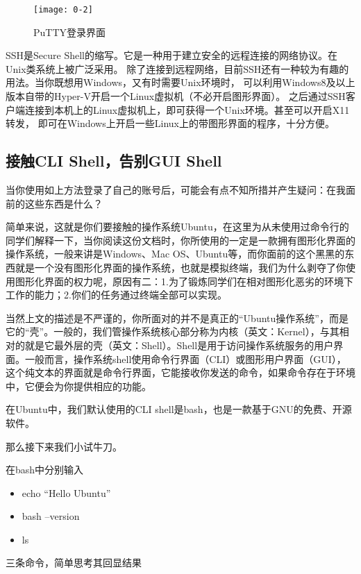 \begin{figure}[htbp]
  \centering
  \texttt{[image: 0-2]}
  \caption{PuTTY登录界面}\label{fig:0-2}
\end{figure}

\begin{note}
SSH是Secure Shell的缩写。它是一种用于建立安全的远程连接的网络协议。在Unix类系统上被广泛采用。
除了连接到远程网络，目前SSH还有一种较为有趣的用法。当你既想用Windows，又有时需要Unix环境时，
可以利用Windows8及以上版本自带的Hyper-V开启一个Linux虚拟机（不必开启图形界面）。
之后通过SSH客户端连接到本机上的Linux虚拟机上，即可获得一个Unix环境。甚至可以开启X11转发，
即可在Windows上开启一些Linux上的带图形界面的程序，十分方便。
\end{note}

\subsection{接触CLI Shell，告别GUI Shell}

当你使用如上方法登录了自己的账号后，可能会有点不知所措并产生疑问：在我面前的这些东西是什么？

简单来说，这就是你们要接触的操作系统Ubuntu，在这里为从未使用过命令行的同学们解释一下，当你阅读这份文档时，你所使用的一定是一款拥有图形化界面的操作系统，一般来讲是Windows、Mac OS、Ubuntu等，而你面前的这个黑黑的东西就是一个没有图形化界面的操作系统，也就是模拟终端，我们为什么剥夺了你使用图形化界面的权力呢，原因有二：1.为了锻炼同学们在相对图形化恶劣的环境下工作的能力；2.你们的任务通过终端全部可以实现。

当然上文的描述是不严谨的，你所面对的并不是真正的“Ubuntu操作系统”，而是它的“壳”。一般的，我们管操作系统核心部分称为内核（英文：Kernel），与其相对的就是它最外层的壳（英文：Shell）。Shell是用于访问操作系统服务的用户界面。一般而言，操作系统shell使用命令行界面（CLI）或图形用户界面（GUI），这个纯文本的界面就是命令行界面，它能接收你发送的命令，如果命令存在于环境中，它便会为你提供相应的功能。

在Ubuntu中，我们默认使用的CLI shell是bash，也是一款基于GNU的免费、开源软件。

那么接下来我们小试牛刀。

\begin{exercise}
在bash中分别输入
  \begin{itemize}
    \item echo “Hello Ubuntu”
    \item bash --version
    \item ls
  \end{itemize}
三条命令，简单思考其回显结果
\end{exercise}

